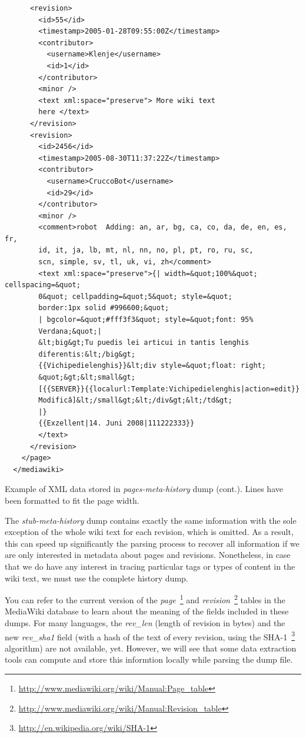 \begin{program}
  \begin{small}
  \begin{verbatim}
      <revision>
        <id>55</id>
        <timestamp>2005-01-28T09:55:00Z</timestamp>
        <contributor>
          <username>Klenje</username>
          <id>1</id>
        </contributor>
        <minor />
        <text xml:space="preserve"> More wiki text
        here </text>
      </revision>
      <revision>
        <id>2456</id>
        <timestamp>2005-08-30T11:37:22Z</timestamp>
        <contributor>
          <username>CruccoBot</username>
          <id>29</id>
        </contributor>
        <minor />
        <comment>robot  Adding: an, ar, bg, ca, co, da, de, en, es, fr, 
        id, it, ja, lb, mt, nl, nn, no, pl, pt, ro, ru, sc, 
        scn, simple, sv, tl, uk, vi, zh</comment>
        <text xml:space="preserve">{| width=&quot;100%&quot; cellspacing=&quot;
        0&quot; cellpadding=&quot;5&quot; style=&quot;
        border:1px solid #996600;&quot; 
        | bgcolor=&quot;#fff3f3&quot; style=&quot;font: 95% 
        Verdana;&quot;| 
        &lt;big&gt;Tu puedis lei articui in tantis lenghis 
        diferentis:&lt;/big&gt;
        {{Vichipedielenghis}}&lt;div style=&quot;float: right;
        &quot;&gt;&lt;small&gt;
        [{{SERVER}}{{localurl:Template:Vichipedielenghis|action=edit}}   
        Modificâ]&lt;/small&gt;&lt;/div&gt;&lt;/td&gt;
        |}
        {{Exzellent|14. Juni 2008|111222333}}
        </text>
      </revision>
    </page>
  </mediawiki>
  \end{verbatim}
  \end{small}
  \caption{Example of XML data stored in \textit{pages-meta-history} dump (cont.). Lines
  have been formatted to fit the page width.}
  \label{code:xml-dump-2}
\end{program}

The \textit{stub-meta-history} dump contains exactly the same information with
the sole exception of the whole wiki text for each revision, which is omitted.
As a result, this can speed up significantly the parsing process to recover all
information if we are only interested in metadata about pages and revisions.
Nonetheless, in case that we do have any interest in tracing particular tags or
types of content in the wiki text, we must use the complete history dump.

You can refer to the current version of the \textit{page}~\footnote{\url{http://www.mediawiki.org/wiki/Manual:Page\_table}}
and \textit{revision}~\footnote{\url{http://www.mediawiki.org/wiki/Manual:Revision\_table}}
tables in the MediaWiki database to learn about the meaning of the fields included
in these dumps. For many languages, the \textit{rev\_len} (length of revision in
bytes) and the new \textit{rev\_sha1} field (with a hash of the text of every revision,
using the SHA-1~\footnote{\url{http://en.wikipedia.org/wiki/SHA-1}} algorithm) are
not available, yet. However, we will see that some data extraction tools can compute
and store this informtion locally while parsing the dump file.

